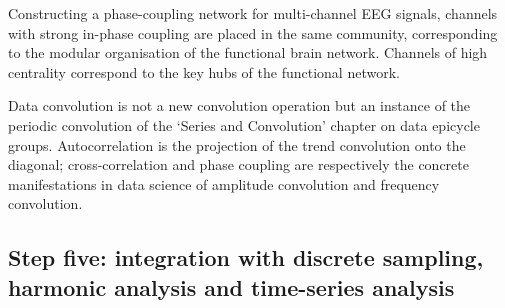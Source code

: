 \begin{example}\label{ex:phase_network}
Constructing a phase-coupling network for multi-channel EEG signals, channels with strong in-phase coupling are placed in the same community, corresponding to the modular organisation of the functional brain network. Channels of high centrality correspond to the key hubs of the functional network.
\end{example}

\begin{remark}\label{rem:data_convolution_relation}
Data convolution is not a new convolution operation but an instance of the periodic convolution of the `Series and Convolution' chapter on data epicycle groups. Autocorrelation is the projection of the trend convolution onto the diagonal; cross-correlation and phase coupling are respectively the concrete manifestations in data science of amplitude convolution and frequency convolution.
\end{remark}

\subsection{Step five: integration with discrete sampling, harmonic analysis and time-series analysis}

